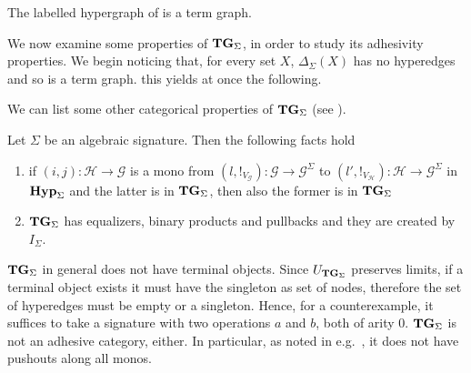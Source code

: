 \documentclass[3p]{elsarticle}
\newcommand{\Set}{\mathbf{Set}}
\newcommand{\catname}[1]{\textbf{\textup{#1}}}
\newcommand{\hyp}{\catname{Hyp}}
\newcommand{\tg}[0]{\catname{TG}_{\Sigma}}
\newcommand{\commentato}[1]{ {} }
\theoremstyle{remark}
\theoremstyle{definition}
\begin{document}
\begin{exa}
The labelled hypergraph of  is a term graph.
\end{exa}


We now examine some properties of $\tg$, in order to study its adhesivity properties. We begin noticing that, for every set $X$,  $\Delta_\Sigma(X)$ has no hyperedges and so is a term graph. this yields at once the following.

\commentato{
\begin{proof}
	This follows noticing that $\Delta_{\Sigma}(X)$ is a term graph for every object $X$.
\end{proof}}

We can list some other categorical properties of $\tg$ (see \cite[Sec.~5]{CastelnovoGM24}).


\begin{prop}\label{prop:tlim}
Let $\Sigma$ be an algebraic signature. Then the following facts hold
\begin{enumerate}
	\item if  $(i,j)\colon \mathcal{H}\to \mathcal{G}$ is a mono from $(l, !_{V_\mathcal{G}})\colon \mathcal{G}\to \mathcal{G}^{\Sigma}$ to $(l', !_{V_\mathcal{H}})\colon \mathcal{H}\to \mathcal{G}^{\Sigma}$ in $\hyp_\Sigma$ and the latter is in $\tg$, then also the former is in $\tg$
	\item $\tg$ has equalizers, binary products and pullbacks and they are created by $I_\Sigma$.
\end{enumerate}
\end{prop}

\begin{rem}
	$\tg$ in general does not have terminal objects. 
	Since $U_{\tg}$ preserves limits, if a terminal object exists it must have the singleton as set of nodes, therefore the set of hyperedges must be empty or a singleton. 
	Hence, for a counterexample, it suffices to take a signature with two operations $a$ and $b$, both of arity $0$.
	$\tg$ is not an adhesive category, either. 
	In particular, as noted in e.g.~\cite{CastelnovoGM24}, 
	 it does not have pushouts along all monos. 
\end{rem}
	
\end{document}
